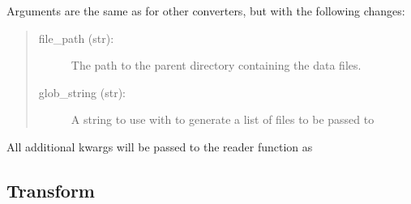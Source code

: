 \documentclass[letterpaper,10pt,english]{sphinxmanual}
\begin{document}
\begin{fulllineitems}

\begin{fulllineitems}
\label{\detokenize{converters:colabfit.tools.converters.FolderConverter._load}}
\sphinxAtStartPar
Arguments are the same as for other converters, but with the following
changes:
\begin{quote}
\begin{description}
\item[{file\_path (str):}] \leavevmode
\sphinxAtStartPar
The path to the parent directory containing the data files.

\item[{glob\_string (str):}] \leavevmode
\sphinxAtStartPar
A string to use with  to
generate a list of files to be passed to 

\end{description}
\end{quote}

\sphinxAtStartPar
All additional kwargs will be passed to the reader function as

\end{fulllineitems}


\end{fulllineitems}

\label{\detokenize{transformations:module-colabfit.tools.transformations}}

\subsection{Transform}
\label{\detokenize{transformations:transform}}\label{\detokenize{transformations::doc}}
\end{document}
